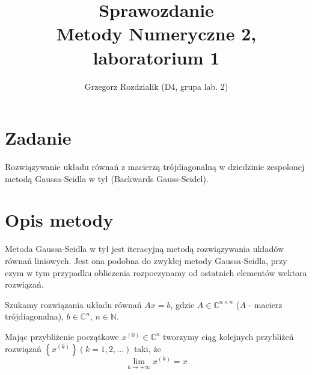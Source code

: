 \documentclass[12pt]{article}
\begin{document}
	\title{Sprawozdanie\\Metody Numeryczne 2, laboratorium 1}
	\author{Grzegorz Rozdzialik (D4, grupa lab. 2)}
	\maketitle	

	\section{Zadanie}
	Rozwiązywanie układu równań z macierzą trójdiagonalną w dziedzinie zespolonej metodą Gaussa-Seidla w tył (Backwards Gauss-Seidel).
	
	\section{Opis metody}
	Metoda Gaussa-Seidla w tył jest iteracyjną metodą rozwiązywania układów równań liniowych. Jest ona podobna do zwykłej metody Gaussa-Seidla, przy czym w tym przypadku obliczenia rozpoczynamy od ostatnich elementów wektora rozwiązań.
	
	Szukamy rozwiązania układu równań $Ax = b$, gdzie
	$A \in \mathbb{C}^{n \times n}$ ($A$ - macierz trójdiagonalna),
	$b \in \mathbb{C}^{n}$,
	$n \in \mathbb{N}$.
	
	Mając przybliżenie początkowe $x^{(0)} \in \mathbb{C}^n$ tworzymy ciąg kolejnych przybliżeń rozwiązań $\left\{ x^{(k)} \right\} (k = 1, 2, \dots)$ taki, że
	$$\lim_{k \to +\infty} x^{(k)} = x$$
\end{document}
